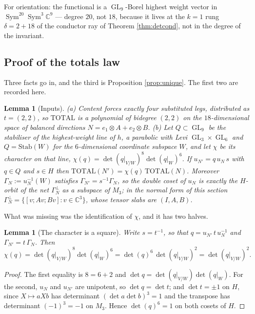 \documentclass[11pt,reqno]{amsart}
\theoremstyle{plain}
\newtheorem{lemma}[theorem]{Lemma}
\theoremstyle{definition}
\DeclareMathOperator{\GL}{GL}
\DeclareMathOperator{\Sym}{Sym}
\newcommand{\bC}{\mathbb{C}}
\begin{document}
For orientation: the functional is a $\GL_9$-Borel highest weight vector in
$\Sym^{20}\Sym^{3}\bC^{9}$ --- degree $20$, not $18$, because it lives at the
$k=1$ rung $\delta=2+18$ of the conductor ray of Theorem \ref{thm:detcond}, not
in the degree of the invariant.

\subsection*{Proof of the totals law}

Three facts go in, and the third is Proposition \ref{prop:unique}.  The first
two are recorded here.

\begin{lemma}[Inputs]\label{lem:inputs}
\emph{(a)}  Content forces exactly four substituted legs, distributed as
$t=(2,2)$, so $\mathrm{TOTAL}$ is a polynomial of bidegree $(2,2)$ on the
$18$-dimensional space of balanced directions
$N=e_1\otimes A+e_2\otimes B$.
\emph{(b)}  Let $Q\subset\GL_9$ be the stabiliser of the highest-weight line of
$h$, a parabolic with Levi $\GL_3\times\GL_6$ and $Q=\mathrm{Stab}(W)$ for the
$6$-dimensional coordinate subspace $W$, and let $\chi$ be its character on that
line, $\chi(q)=\det(q|_{V/W})^{8}\det(q|_{W})^{6}$.  If $u_{N'}=q\,u_N\,s$ with
$q\in Q$ and $s\in H$ then $\mathrm{TOTAL}(N')=\chi(q)\,\mathrm{TOTAL}(N)$.
Moreover $\Gamma_N:=u_N^{-1}(W)$ satisfies $\Gamma_{N'}=s^{-1}\Gamma_N$, so the
double coset of $u_N$ is exactly the $H$-orbit of the net $\Gamma_N^{\perp}$
\emph{as a subspace} of $M_3$; in the normal form of this section
$\Gamma_N^{\perp}=\{[v;Av;Bv]:v\in\bC^{3}\}$, whose tensor slabs are $(I,A,B)$.
\end{lemma}

What was missing was the identification of $\chi$, and it has two halves.

\begin{lemma}[The character is a square]\label{lem:sq}
Write $s=t^{-1}$, so that $q=u_{N'}\,t\,u_N^{-1}$ and $\Gamma_{N'}=t\,\Gamma_N$.
Then
\[
  \chi(q)=\det(q|_{V/W})^{8}\det(q|_{W})^{6}
        =\det(q)^{6}\,\det(q|_{V/W})^{2}
        =\det(q|_{V/W})^{2}.
\]
\end{lemma}

\begin{proof}
The first equality is $8=6+2$ and $\det q=\det(q|_{V/W})\det(q|_{W})$.  For the
second, $u_N$ and $u_{N'}$ are unipotent, so $\det q=\det t$; and $\det t=\pm1$
on $H$, since $X\mapsto aXb$ has determinant $(\det a\det b)^{3}=1$ and the
transpose has determinant $(-1)^{3}=-1$ on $M_3$.  Hence $\det(q)^{6}=1$ on
both cosets of $H$.
\end{proof}
\end{document}

